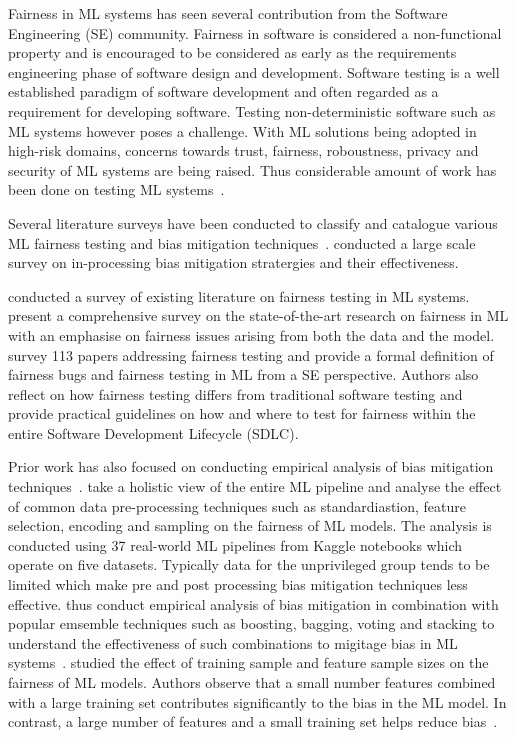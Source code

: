 \documentclass{article}
\begin{document}
Fairness in ML systems has seen several contribution from the Software
Engineering (SE) community. Fairness in software is considered a
non-functional property and is encouraged to be considered as early as
the requirements engineering phase of software design and development.
Software testing is a well established paradigm of software
development and often regarded as a requirement for developing
software. Testing non-deterministic software such as ML systems
however poses a challenge. With ML solutions being adopted in
high-risk domains, concerns towards trust, fairness, roboustness,
privacy and security of ML systems are being raised. Thus considerable
amount of work has been done on testing ML
systems \cite{zhang2020machine}.

Several literature surveys have been conducted to classify and
catalogue various ML fairness testing and bias mitigation
techniques \cite{wan2021modeling,mehrabi2021survey,chen2022fairness}.
\citeauthor{wan2021modeling} conducted a large scale survey on
in-processing bias mitigation stratergies and their
effectiveness\cite{wan2021modeling}.

\citeauthor{chen2022fairness,mehrabi2021survey} conducted a survey of
existing literature on fairness testing in ML systems.
\citeauthor{mehrabi2021survey} present a comprehensive survey on the
state-of-the-art research on fairness in ML with an emphasise on
fairness issues arising from both the data and the model.
\citeauthor{chen2022fairness} survey 113 papers addressing fairness
testing and provide a formal definition of fairness bugs and fairness
testing in ML from a SE perspective. Authors also reflect on how
fairness testing differs from traditional software testing and provide
practical guidelines on how and where to test for fairness within the
entire Software Development Lifecycle (SDLC).

Prior work has also focused on conducting empirical analysis of bias
mitigation
techniques \cite{biswas2021fair,feffer2022empirical,zhang2021ignorance}.
\citeauthor{biswas2021fair} take a holistic view of the entire ML
pipeline and analyse the effect of common data pre-processing
techniques such as standardiastion, feature selection, encoding and
sampling on the fairness of ML models. The analysis is conducted using
37 real-world ML pipelines from Kaggle notebooks which operate on five
datasets. Typically data for the unprivileged group tends to be
limited which make pre and post processing bias mitigation techniques
less effective. \citeauthor{feffer2022empirical} thus conduct
empirical analysis of bias mitigation in combination with popular
emsemble techniques such as boosting, bagging, voting and stacking to
understand the effectiveness of such combinations to migitage bias in
ML systems \cite{feffer2022empirical}. \citeauthor{zhang2021ignorance}
studied the effect of training sample and feature sample sizes on the
fairness of ML models. Authors observe that a small number features
combined with a large training set contributes significantly to the
bias in the ML model. In contrast, a large number of features and a
small training set helps reduce bias \cite{zhang2021ignorance}.
\end{document}
